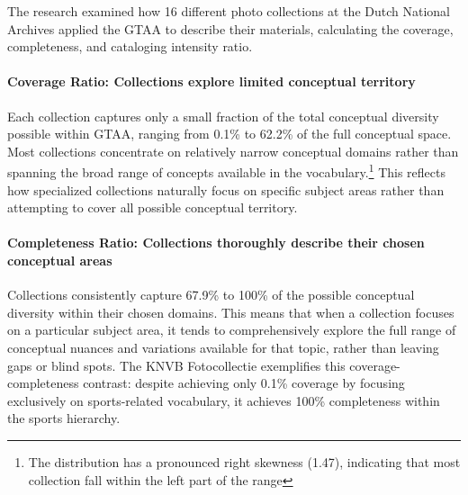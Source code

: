 \documentclass[final]{anthology-ch}
\begin{document}
The research examined how 16 different photo collections at the Dutch National Archives applied the GTAA to describe their materials, calculating the coverage, completeness, and cataloging intensity ratio.

\paragraph{Coverage Ratio: Collections explore limited conceptual territory} Each collection captures only a small fraction of the total conceptual diversity possible within GTAA, ranging from 0.1\% to 62.2\% of the full conceptual space. Most collections concentrate on relatively narrow conceptual domains rather than spanning the broad range of concepts available in the vocabulary.\footnote{The distribution has a pronounced right skewness (1.47), indicating that most collection fall within the left part of the range} This reflects how specialized collections naturally focus on specific subject areas rather than attempting to cover all possible conceptual territory.
\paragraph{Completeness Ratio: Collections thoroughly describe their chosen conceptual areas} Collections consistently capture 67.9\% to 100\% of the possible conceptual diversity within their chosen domains. This means that when a collection focuses on a particular subject area, it tends to comprehensively explore the full range of conceptual nuances and variations available for that topic, rather than leaving gaps or blind spots. The KNVB Fotocollectie exemplifies this coverage-completeness contrast: despite achieving only 0.1\% coverage by focusing exclusively on sports-related vocabulary, it achieves 100\% completeness within the sports hierarchy.
\end{document}
